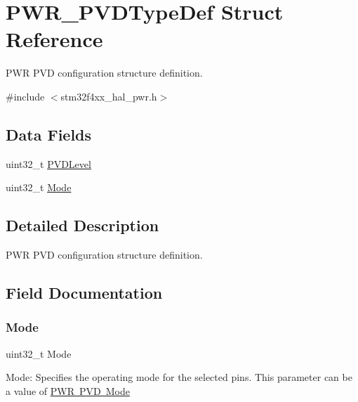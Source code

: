 \hypertarget{struct_p_w_r___p_v_d_type_def}{}\section{P\+W\+R\+\_\+\+P\+V\+D\+Type\+Def Struct Reference}
\label{struct_p_w_r___p_v_d_type_def}


P\+WR P\+VD configuration structure definition.  




{\ttfamily \#include $<$stm32f4xx\+\_\+hal\+\_\+pwr.\+h$>$}

\subsection*{Data Fields}
\begin{DoxyCompactItemize}
\item 
uint32\+\_\+t \mbox{\hyperlink{struct_p_w_r___p_v_d_type_def_abf0db5c2b84ba24ffeedab5cf06bad31}{P\+V\+D\+Level}}
\item 
uint32\+\_\+t \mbox{\hyperlink{struct_p_w_r___p_v_d_type_def_a0ffc93ec511ed9cf1663f6939bd3e839}{Mode}}
\end{DoxyCompactItemize}


\subsection{Detailed Description}
P\+WR P\+VD configuration structure definition. 

\subsection{Field Documentation}
\mbox{\label{struct_p_w_r___p_v_d_type_def_a0ffc93ec511ed9cf1663f6939bd3e839}} 
\subsubsection{\texorpdfstring{Mode}{Mode}}
{\footnotesize\ttfamily uint32\+\_\+t Mode}

Mode\+: Specifies the operating mode for the selected pins. This parameter can be a value of \mbox{\hyperlink{group___p_w_r___p_v_d___mode}{P\+WR P\+VD Mode}} \mbox{\label{struct_p_w_r___p_v_d_type_def_abf0db5c2b84ba24ffeedab5cf06bad31}} 

